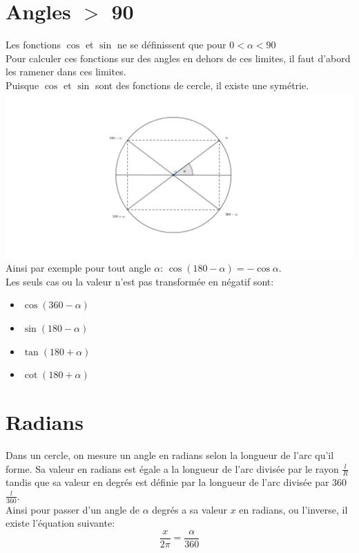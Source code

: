 \documentclass[12pt]{article}
\begin{document}
\section{Angles $>$ 90\textdegree}
Les fonctions $\cos$ et $\sin$ ne se définissent que pour $0 < \alpha < 90$ \\
Pour calculer ces fonctions sur des angles en dehors de ces limites, il faut d'abord les ramener dans ces limites. \\
Puisque $\cos$ et $\sin$ sont des fonctions de cercle, il existe une symétrie.  \\

\includegraphics{circle_trigo_symetry.png}\\
Ainsi par exemple pour tout angle $\alpha$: $\cos(180-\alpha) = - \cos\alpha$.\\
Les seuls cas ou la valeur n'est pas transformée en négatif sont:\\
\begin{itemize}
  \item $\cos(360 - \alpha)$
  \item $\sin(180 - \alpha)$
  \item $\tan(180 + \alpha) $
  \item $\cot(180 + \alpha)$
\end{itemize}

\section{Radians}
Dans un cercle, on mesure un angle en radians selon la longueur de l'arc qu'il forme. Sa valeur en radians est égale a la longueur de l'arc divisée par le rayon $\frac{l}{R}$ tandis que sa valeur en degrés est définie par la longueur de l'arc divisée par 360 $\frac{l}{360}$.\\
Ainsi pour passer d'un angle de $\alpha$ degrés a sa valeur $x$ en radians, ou l'inverse, il existe l'équation suivante: \\
\begin{equation}
  \frac{x}{2\pi} = \frac{\alpha}{360}
\end{equation}
\end{document}
